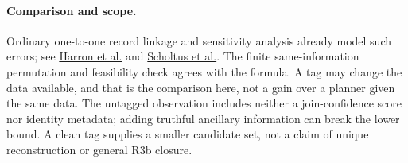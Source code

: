 \documentclass{article}
\begin{document}
\paragraph{Comparison and scope.}
Ordinary one-to-one record linkage and sensitivity analysis already
model such errors; see
\href{https://doi.org/10.1093/ije/dyx177}{Harron et al.} and
\href{https://www.sciencedirect.com/science/article/pii/S0378375821001063}{Scholtus et al.}.
The finite same-information permutation and feasibility check agrees
with the formula. A tag may change the data available, and that is the
comparison here, not a gain over a planner given the same data.
The untagged observation includes neither a join-confidence score nor
identity metadata; adding truthful ancillary information can break the
lower bound. A clean tag supplies a smaller candidate set, not a claim
of unique reconstruction or general R3b closure.
\end{document}
